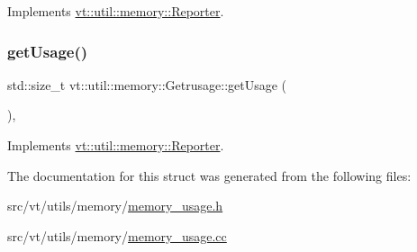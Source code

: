 Implements \hyperlink{structvt_1_1util_1_1memory_1_1_reporter_a83fc36e9cff3ce2deedf1d4546694713}{vt\+::util\+::memory\+::\+Reporter}.

\mbox{\label{structvt_1_1util_1_1memory_1_1_getrusage_a976a842feb631dfb19c2f4ecda2398ab}} 
\subsubsection{\texorpdfstring{get\+Usage()}{getUsage()}}
{\footnotesize\ttfamily std\+::size\+\_\+t vt\+::util\+::memory\+::\+Getrusage\+::get\+Usage (\begin{DoxyParamCaption}{ }\end{DoxyParamCaption})\hspace{0.3cm}{\ttfamily [override]}, {\ttfamily [virtual]}}



Implements \hyperlink{structvt_1_1util_1_1memory_1_1_reporter_a372574f51fdb68077cd3d227ee373de5}{vt\+::util\+::memory\+::\+Reporter}.



The documentation for this struct was generated from the following files\+:\begin{DoxyCompactItemize}
\item 
src/vt/utils/memory/\hyperlink{memory__usage_8h}{memory\+\_\+usage.\+h}\item 
src/vt/utils/memory/\hyperlink{memory__usage_8cc}{memory\+\_\+usage.\+cc}\end{DoxyCompactItemize}
